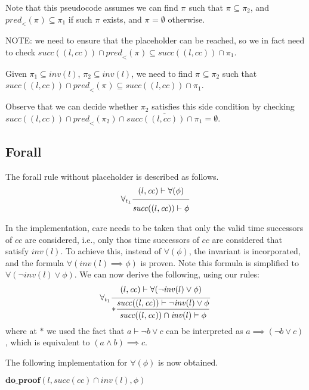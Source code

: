 \documentclass{article}
\newcommand{\proofrule}[3][]{#1 \frac{\raisebox{.7ex}{\normalsize{$#2$}}}
  {\raisebox{-1.0ex}{\normalsize{$#3$}}}}
\newcommand{\placeholder}[1][]{\pi_{#1}}
\newcommand{\loc}{l}
\newcommand{\region}{\mathit{cc}}
\newcommand{\suc}{\mathit{succ}}
\newcommand{\pre}{\mathit{pred}}
\newcommand{\inv}{\mathit{inv}}
\newcommand{\method}[1]{\ensuremath{\mathbf{#1}}}
\begin{document}
Note that this pseudocode assumes we can find $\placeholder$ such that 
$\placeholder \subseteq \placeholder[2]$, and
$\pre_{<}(\placeholder) \subseteq \placeholder[1]$ if such $\placeholder$ exists,
and $\placeholder = \emptyset$ otherwise.

{\color{red} NOTE: we need to ensure that the placeholder can be reached, so we in fact need to
check $\suc((\loc, \region)) \cap \pre_{<}(\placeholder) \subseteq \suc((\loc, \region)) \cap \placeholder[1]$.}

Given $\placeholder[1] \subseteq \inv(\loc)$, $\placeholder[2] \subseteq \inv(\loc)$, we need to find $\placeholder \subseteq \placeholder[2]$ such that
$\suc((\loc, \region)) \cap \pre_{<}(\placeholder) \subseteq \suc((\loc, \region)) \cap \placeholder[1]$.

Observe that we can decide whether $\placeholder[2]$ satisfies this side condition by checking $\suc((\loc, \region)) \cap \pre_{<}(\placeholder[2]) \cap \overline{\suc((\loc, \region)) \cap \placeholder[1]} = \emptyset$.

\subsection{Forall}

The forall rule without placeholder is described as follows.
\[
\proofrule[\forall_{t_1}]
{(\loc, \region) \vdash \forall(\phi)}
{\suc((\loc, \region)) \vdash \phi}
\]

In the implementation, care needs to be taken that only the valid time successors of $\region$ are considered,
i.e., only thos time successors of $\region$ are considered that satisfy $\inv(\loc)$. To achieve this,
instead of $\forall(\phi)$, the invariant is incorporated, and the formula $\forall(\inv(\loc) \implies \phi)$
is proven. Note this formula is simplified to $\forall(\lnot \inv(\loc) \lor \phi)$.
We can now derive the following, using our rules:
\[
\proofrule[\forall_{t_1}]
{(\loc, \region) \vdash \forall(\lnot \inv(\loc) \lor \phi)}
{
\proofrule[*]{\suc((\loc, \region)) \vdash \lnot \inv(\loc) \lor \phi}
{\suc((\loc, \region)) \cap \inv(\loc) \vdash \phi
}
}
\]
where at $*$ we used the fact that $a \vdash \lnot b \lor c$ can be interpreted as
$a \implies (\lnot b \lor c)$, which is equivalent to $(a \land b) \implies c$.

The following implementation for $\forall(\phi)$ is now obtained.
\begin{algorithm}[H]
\caption{$\method{do\_proof\_forall}(\loc, \region, \forall(\phi))$}
\begin{algorithmic}
\RETURN $\method{do\_proof}(\loc, \suc(\region) \cap \inv(\loc), \phi)$
\end{algorithmic}
\end{algorithm}
\end{document}
